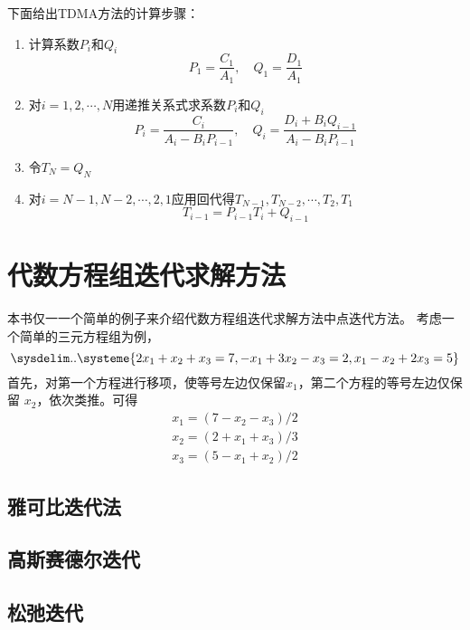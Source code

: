 下面给出TDMA方法的计算步骤：
\begin{enumerate}
  \item 计算系数$P_{i}$和$Q_{i}$
    \begin{equation*}
      P_{1} = \frac{C_{1}}{A_{1}}, \quad Q_{1} = \frac{D_{1}}{A_{1}}
    \end{equation*}
  \item 对$i=1,2,\cdots,N$用递推关系式求系数$P_{i}$和$Q_{i}$
    \begin{equation*}
      P_{i} 
      =
      \frac{C_{i}}{A_{i}-B_{i}P_{i-1}}
      ,\quad
      Q_{i}
      =
      \frac{D_{i}+B_{i}Q_{i-1}}{A_{i}-B_{i}P_{i-1}}
    \end{equation*}
  \item 令$T_{N}=Q_{N}$
  \item 对$i=N-1,N-2,\cdots,2,1$应用回代得$T_{N-1},T_{N-2},\cdots,T_{2},T_{1}$
    \begin{equation*}
      T_{i-1}=P_{i-1}T_{i} + Q_{i-1}
    \end{equation*}
\end{enumerate}

\section{代数方程组迭代求解方法}
本书仅一一个简单的例子来介绍代数方程组迭代求解方法中点迭代方法。
考虑一个简单的三元方程组为例，
\begin{equation}
  \sysdelim..
  \systeme{
    2x_{1} + x_{2} + x_{3} = 7,
    -x_{1} + 3x_{2} -x_{3} = 2,
    x_{1} - x_{2} + 2x_{3} = 5
  }
\end{equation}
首先，对第一个方程进行移项，使等号左边仅保留$x_{1}$，第二个方程的等号左边仅保留
$x_{2}$，依次类推。可得
\begin{equation}
\begin{aligned}
    x_{1} =(7-x_{2}-x_{3})/2 \\
    x_{2} =(2 +x_{1} +x_{3} )/ 3 \\
    x_{3} =(5- x_{1} + x_{2} )/ 2
\end{aligned}
\end{equation}
\subsection{雅可比迭代法}
\subsection{高斯赛德尔迭代}
\subsection{松弛迭代}


